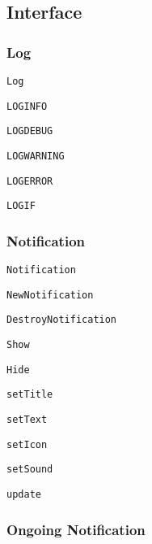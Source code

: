 \subsection*{Interface}

\subsubsection*{Log}


\begin{DoxyItemize}
\item {\tt Log}
\begin{DoxyItemize}
\item {\tt L\-O\-G\-I\-N\-F\-O}
\item {\tt L\-O\-G\-D\-E\-B\-U\-G}
\item {\tt L\-O\-G\-W\-A\-R\-N\-I\-N\-G}
\item {\tt L\-O\-G\-E\-R\-R\-O\-R}
\item {\tt L\-O\-G\-I\-F}
\end{DoxyItemize}
\end{DoxyItemize}

\subsubsection*{Notification}


\begin{DoxyItemize}
\item {\tt Notification}
\begin{DoxyItemize}
\item {\tt New\-Notification}
\item {\tt Destroy\-Notification}
\item {\tt Show}
\item {\tt Hide}
\item {\tt set\-Title}
\item {\tt set\-Text}
\item {\tt set\-Icon}
\item {\tt set\-Sound}
\item {\tt update}
\end{DoxyItemize}
\end{DoxyItemize}

\subsubsection*{Ongoing Notification}


